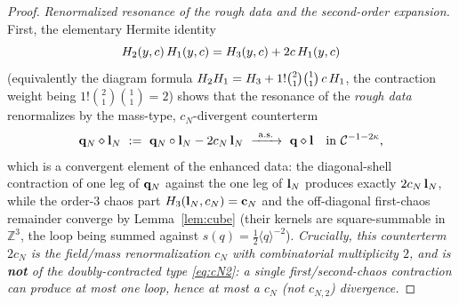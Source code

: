 \begin{proof}
\emph{Renormalized resonance of the rough data and the second-order expansion.}
First, the elementary Hermite identity
\begin{equation}\label{eq:He2He1}
H_2(y,c)\,H_1(y,c)=H_3(y,c)+2c\,H_1(y,c)
\end{equation}
(equivalently the diagram formula $H_2H_1=H_3+1!\binom21\binom11\,c\,H_1$,
the contraction weight being $1!\binom21\binom11=2$) shows that the resonance of the
\emph{rough data} renormalizes by the mass-type, $c_N$-divergent counterterm
\begin{equation}\label{eq:resLL}
\qoneLsq_N\diamond\qoneLin_N\ :=\ \qoneLsq_N\circ\qoneLin_N-2c_N\,\qoneLin_N\ \xrightarrow{\ \mathrm{a.s.}\ }\ \qoneLsq\diamond\qoneLin\quad\text{in }\qoneC^{-1-2\kappa},
\end{equation}
which is a convergent element of the enhanced data: the diagonal-shell contraction
of one leg of $\mathbf{q}_N$ against the one leg of $\mathbf{l}_N$ produces exactly
$2c_N\,\mathbf{l}_N$, while the order-$3$ chaos part $H_3(\mathbf{l}_N,c_N)=\mathbf{c}_N$ and
the off-diagonal first-chaos remainder converge by Lemma~\ref{lem:cube}
(their kernels are square-summable in $\mathbb Z^3$, the loop being summed against
$s(q)=\tfrac12\langle q\rangle^{-2}$). \emph{Crucially, this counterterm $2c_N$ is the
field/mass renormalization $c_N$ with combinatorial multiplicity $2$, and is
\textbf{not} of the doubly-contracted type \eqref{eq:cN2}: a single first/second-chaos
contraction can produce at most one loop, hence at most a $c_N$ (not $c_{N,2}$)
divergence.}


\end{proof}
